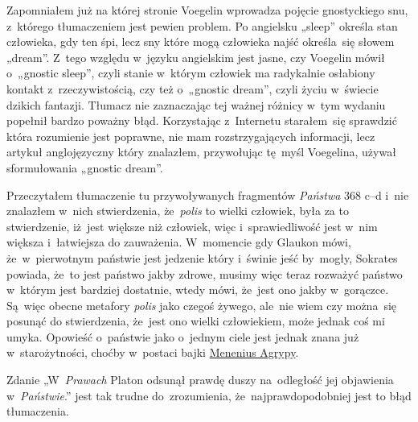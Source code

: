 \documentclass[a4paper,11pt]{article}
\begin{document}
\vspace{\spaceTwo}






\start Zapomniałem już na której stronie Voegelin wprowadza pojęcie
gnostyckiego snu, z~którego tłumaczeniem jest pewien problem. Po
angielsku „sleep” określa stan człowieka, gdy ten śpi, lecz sny
które mogą człowieka najść określa~się słowem „dream”. Z~tego
względu w~języku angielskim jest jasne, czy Voegelin mówił o~„gnostic
sleep”, czyli stanie w~którym człowiek ma radykalnie osłabiony
kontakt z~rzeczywistością, czy też o~„gnostic dream”, czyli życiu
w~świecie dzikich fantazji. Tłumacz nie zaznaczając tej ważnej różnicy
w~tym wydaniu popełnił bardzo poważny błąd. Korzystając z~Internetu
starałem~się sprawdzić która rozumienie jest poprawne, nie mam
rozstrzygających informacji, lecz artykuł anglojęzyczny który
znalazłem, przywołując tę~myśl Voegelina, używał sformułowania
„gnostic dream”.

\vspace{\spaceFour}


\start {} Przeczytałem tłumaczenie tu przywoływanych fragmentów
\textit{Państwa} 368 c--d i~nie znalazłem w~nich stwierdzenia,
że~\textit{polis} to wielki człowiek, była za to stwierdzenie,
iż~jest większe niż człowiek, więc i~sprawiedliwość jest
w~nim większa i~łatwiejsza do zauważenia. W~momencie gdy Glaukon mówi,
że~w~pierwotnym państwie jest jedzenie który i~świnie jeść by~mogły,
Sokrates powiada, że~to jest państwo jakby zdrowe, musimy więc teraz
rozważyć państwo w~którym jest bardziej dostatnie, wtedy mówi, że~jest
ono jakby w~gorączce. Są~więc obecne metafory \textit{polis} jako czegoś
żywego, ale~nie wiem czy można~się posunąć do stwierdzenia, że~jest
ono wielki człowiekiem, może jednak coś mi umyka. Opowieść o~państwie
jako o~jednym ciele jest jednak znana już w~starożytności, choćby
w~postaci bajki
\href{https://en.wikipedia.org/wiki/Agrippa_Menenius_Lanatus_(consul_503_BC)}
{Menenius Agrypy}.

\vspace{\spaceFour}


\start {} Zdanie „W~\textit{Prawach} Platon odsunął prawdę
duszy na~odległość jej objawienia w~\textit{Państwie}.” jest tak trudne
do~zrozumienia, że~najprawdopodobniej jest to błąd tłumaczenia.
\end{document}
